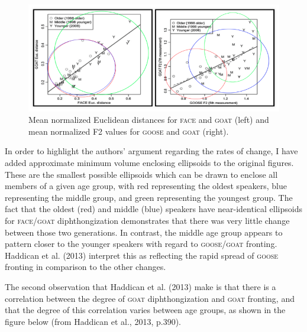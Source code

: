 \documentclass{article}
\begin{document}
\begin{figure}[ht!]
\hspace{-1.5cm}
\includegraphics[scale=0.6]{D_lawrence_fronting_and_diphthongization.png}
\caption{Mean normalized Euclidean distances for \textsc{face} and \textsc{goat} (left) and mean normalized F2 values for \textsc{goose} and \textsc{goat} (right).}
\end{figure}

In order to highlight the authors' argument regarding the rates of change, I have added approximate minimum volume enclosing ellipsoids to the original figures. These are the smallest possible ellipsoids which can be drawn to enclose all members of a given age group, with red representing the oldest speakers, blue representing the middle group, and green representing the youngest group. The fact that the oldest (red) and middle (blue) speakers have near-identical ellipsoids for \textsc{face}/\textsc{goat} diphthongization demonstrates that there was very little change between those two generations. In contrast, the middle age group appears to pattern closer to the younger speakers with regard to \textsc{goose}/\textsc{goat} fronting. Haddican et al. (2013) interpret this as reflecting the rapid spread of \textsc{goose} fronting in comparison to the other changes.

The second observation that Haddican et al. (2013) make is that there is a correlation between the degree of \textsc{goat} diphthongization and \textsc{goat} fronting, and that the degree of this correlation varies between age groups, as shown in the figure below (from Haddican et al., 2013, p.390).
\end{document}
